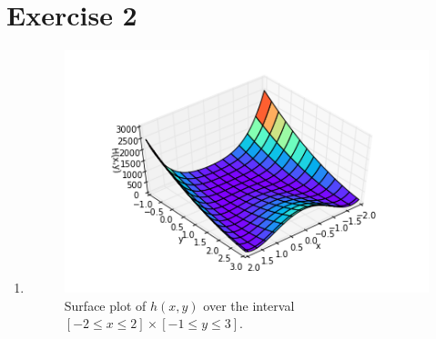\documentclass[a4paper,11pt]{article}
\theoremstyle{mytheor}
\begin{document}
\pagebreak
\section*{Exercise 2}
\begin{enumerate}
	\item \begin{figure}[h!]
   			\centering
   			\includegraphics{surfaceplot.png}\vspace{-0.5cm}
   			\caption{\vspace{-0.2cm} Surface plot of $h(x,y)$ over the interval $[-2\leq x \leq 2] \times [-1 \leq y \leq 3]$.}
  		\end{figure}
 

\end{enumerate}
\end{document}
